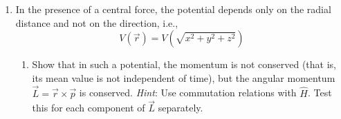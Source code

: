 \documentclass[../psets.tex]{subfiles}
\begin{document}
\begin{enumerate}
\begin{enumerate}
\begin{proof}
            \begin{align*}
                A\e[-\kappa_\text{I}a] &= C_\text{II}\cos(k_\text{II}a)\\
                \kappa_\text{I}A\e[-\kappa_\text{I}a] &= k_\text{II}C_\text{II}\sin(k_\text{II}a)\\
                C_\text{II}\cos(k_\text{II}a) &= G\e[-\kappa_\text{I}a]\\
                -k_\text{II}C_\text{II}\sin(k_\text{II}a) &= -\kappa_\text{I}G\e[-\kappa_\text{I}a]
            \end{align*}
            From here, we may obtain the important result that
            \begin{align*}
                \kappa_\text{I} &= k_\text{II}\tan(k_\text{II}a)\\
                \Aboxed{\frac{\sqrt{2m(V_1-E_{n_1})}}{\hbar} &= \frac{\sqrt{2mE_{n_1}}}{\hbar}\tan(\frac{\sqrt{2mE_{n_1}}}{\hbar}a)}
            \end{align*}
            Similarly, for the odd solutions, we may obtain that
            \begin{equation*}
                \boxed{\frac{\sqrt{2m(V_1-E_{n_1})}}{\hbar} = -\frac{\sqrt{2mE_{n_1}}}{\hbar}\cot(\frac{\sqrt{2mE_{n_1}}}{\hbar}a)}
            \end{equation*}
            Energies may be obtained by solving either of these equations. This energy may then be added onto the other two as in part (b).
        \end{proof}
        \item What happens when the three $V_i$'s become finite?
        \begin{proof}
            We will obtain three energies of the form in part (c), all of which may be added together as in part (b).
        \end{proof}
    \end{enumerate}
    \item In the presence of a central force, the potential depends only on the radial distance and not on the direction, i.e.,
    \begin{equation}
        V(\vec{r}) = V(\sqrt{x^2+y^2+z^2})
    \end{equation}
    \begin{enumerate}
        \item Show that in such a potential, the momentum is not conserved (that is, its mean value is not independent of time), but the angular momentum $\vec{L}=\vec{r}\times\vec{p}$ is conserved. \emph{Hint}: Use commutation relations with $\hat{H}$. Test this for each component of $\vec{L}$ separately.

\end{enumerate}
\end{enumerate}
\end{document}
